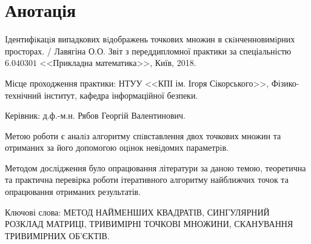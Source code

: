


\chapter*{Анотація}

Iдентифiкацiя випадкових вiдображень точкових множин в
скiнченновимiрних просторах. / Лавягіна О.О.
Звіт з переддипломної практики за спеціальністю $6.040301$
<<Прикладна математика>>, Київ, 2018.

Місце проходження практики: НТУУ <<КПІ ім. Ігоря Сікорського>>,
Фізико-технічний інститут, кафедра інформаційної безпеки.

Керівник: д.ф.-м.н. Рябов Георгій Валентинович.

Метою роботи є аналiз алгоритму спiвставлення двох точкових
множин та отриманих за його допомогою оцiнок невiдомих параметрiв.

Методом дослідження було опрацювання літератури за даною темою,
теоретична та практична перевірка роботи ітеративного алгоритму найближчих
точок та опрацювання отриманих результатів.

Ключові слова: МЕТОД НАЙМЕНШИХ КВАДРАТІВ, СИНГУЛЯРНИЙ РОЗКЛАД МАТРИЦІ,
ТРИВИМІРНІ ТОЧКОВІ МНОЖИНИ, СКАНУВАННЯ ТРИВИМІРНИХ ОБ'ЄКТІВ.

